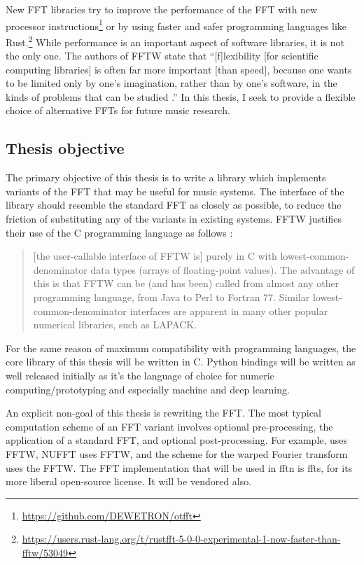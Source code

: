 \documentclass[letter,12pt,notitlepage]{article}
\begin{document}
New FFT libraries try to improve the performance of the FFT with new processor instructions\footnote{\href{https://github.com/DEWETRON/otfft}{https://github.com/DEWETRON/otfft}} or by using faster and safer programming languages like Rust.\footnote{\href{https://users.rust-lang.org/t/rustfft-5-0-0-experimental-1-now-faster-than-fftw/53049}{https://users.rust-lang.org/t/rustfft-5-0-0-experimental-1-now-faster-than-fftw/53049}} While performance is an important aspect of software libraries, it is not the only one. The authors of FFTW state that ``[f]lexibility [for scientific computing libraries] is often far more important [than speed], because one wants to be limited only by one's imagination, rather than by one's software, in the kinds of problems that can be studied  \cite{fftw2}.'' In this thesis, I seek to provide a flexible choice of alternative FFTs for future music research.

\subsection{Thesis objective}

The primary objective of this thesis is to write a library which implements variants of the FFT that may be useful for music systems. The interface of the library should resemble the standard FFT as closely as possible, to reduce the friction of substituting any of the variants in existing systems. FFTW justifies their use of the C programming language as follows \cite{fftw2}:

\begin{quote}
	[the user-callable interface of FFTW is] purely in C with lowest-common-denominator data types (arrays of floating-point values). The advantage of this is that FFTW can be (and has been) called from almost any other programming language, from Java to Perl to Fortran 77. Similar lowest-common-denominator interfaces are apparent in many other popular numerical libraries, such as LAPACK.
\end{quote}

For the same reason of maximum compatibility with programming languages, the core library of this thesis will be written in C. Python bindings will be written as well released initially as it's  the language of choice for numeric computing/prototyping and especially machine and deep learning. 

An explicit non-goal of this thesis is rewriting the FFT. The most typical computation scheme of an FFT variant involves optional pre-processing, the application of a standard FFT, and optional post-processing. For example, \citet{sparse} uses FFTW, NUFFT uses FFTW, and the scheme for the warped Fourier transform uses the FFTW. The FFT implementation that will be used in fftn is  ffts, for its more liberal open-source license.  It will be vendored also.
\end{document}
